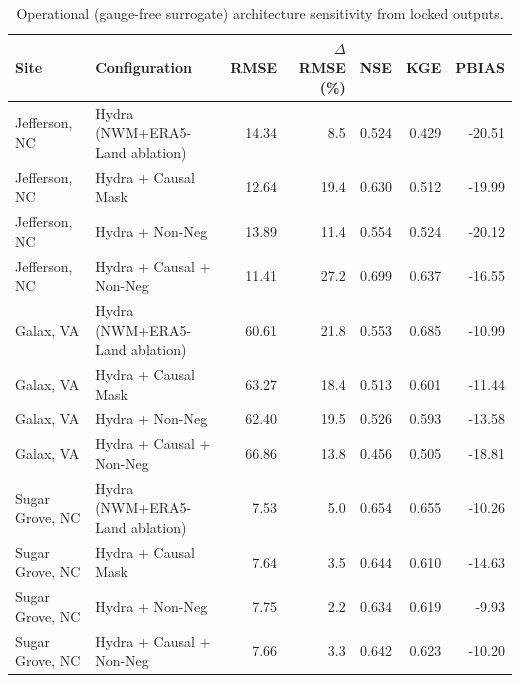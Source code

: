 \begin{table}
\centering
\caption{Operational (gauge-free surrogate) architecture sensitivity from locked outputs.}
\small
\begin{tabular}{ll r r r r r}
\toprule
\textbf{Site} & \textbf{Configuration} & \textbf{RMSE} & \textbf{$\Delta$RMSE (\%)} & \textbf{NSE} & \textbf{KGE} & \textbf{PBIAS} \\
\midrule
Jefferson, NC & Hydra (NWM+ERA5-Land ablation) & 14.34 & 8.5 & 0.524 & 0.429 & -20.51 \\
Jefferson, NC & Hydra + Causal Mask & 12.64 & 19.4 & 0.630 & 0.512 & -19.99 \\
Jefferson, NC & Hydra + Non-Neg & 13.89 & 11.4 & 0.554 & 0.524 & -20.12 \\
Jefferson, NC & Hydra + Causal + Non-Neg & 11.41 & 27.2 & 0.699 & 0.637 & -16.55 \\
Galax, VA & Hydra (NWM+ERA5-Land ablation) & 60.61 & 21.8 & 0.553 & 0.685 & -10.99 \\
Galax, VA & Hydra + Causal Mask & 63.27 & 18.4 & 0.513 & 0.601 & -11.44 \\
Galax, VA & Hydra + Non-Neg & 62.40 & 19.5 & 0.526 & 0.593 & -13.58 \\
Galax, VA & Hydra + Causal + Non-Neg & 66.86 & 13.8 & 0.456 & 0.505 & -18.81 \\
Sugar Grove, NC & Hydra (NWM+ERA5-Land ablation) & 7.53 & 5.0 & 0.654 & 0.655 & -10.26 \\
Sugar Grove, NC & Hydra + Causal Mask & 7.64 & 3.5 & 0.644 & 0.610 & -14.63 \\
Sugar Grove, NC & Hydra + Non-Neg & 7.75 & 2.2 & 0.634 & 0.619 & -9.93 \\
Sugar Grove, NC & Hydra + Causal + Non-Neg & 7.66 & 3.3 & 0.642 & 0.623 & -10.20 \\
\bottomrule
\end{tabular}
\label{tab:operational_arch}
\end{table}
